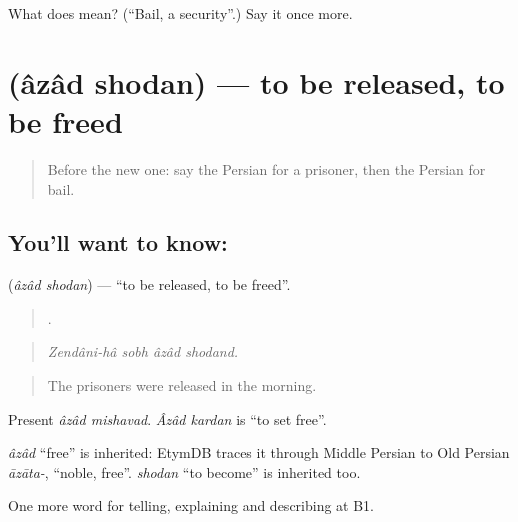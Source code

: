 \begin{tcolorbox}[breakable,colback=teal!4,colframe=teal!35!black,title={Before you move on}]
What does  mean? (\textquotedblleft{}Bail, a security\textquotedblright{}.) Say it once more.
\end{tcolorbox}
\section[\texorpdfstring{\fa{آزاد} \fa{شدن} (âzâd shodan)}{آزاد شدن (âzâd shodan)}]{  (âzâd shodan) — to be released, to be freed}

\label{lesson:FA-C322-azad-shodan}



\begin{quote}
Before the new one: say the Persian for a prisoner, then the Persian for bail.
\end{quote}

\subsection*{You'll want to know:  }
\textbf{ } (\emph{âzâd shodan}) — \textquotedblleft{}to be released, to be freed\textquotedblright{}.

\begin{quote}
    .
\end{quote}

\begin{quote}
\emph{Zendâni-hâ sobh âzâd shodand.}
\end{quote}

\begin{quote}
The prisoners were released in the morning.
\end{quote}

Present \emph{âzâd mishavad}. \emph{Âzâd kardan} is \textquotedblleft{}to set free\textquotedblright{}.

\begin{cousinweb}
\emph{âzâd} \textquotedblleft{}free\textquotedblright{} is inherited: EtymDB traces it through Middle Persian to Old Persian \emph{āzāta-}, \textquotedblleft{}noble, free\textquotedblright{}. \emph{shodan} \textquotedblleft{}to become\textquotedblright{} is inherited too.
\end{cousinweb}

\begin{grammarlens}[title={What you've built}]
One more word for telling, explaining and describing at B1.
\end{grammarlens}

